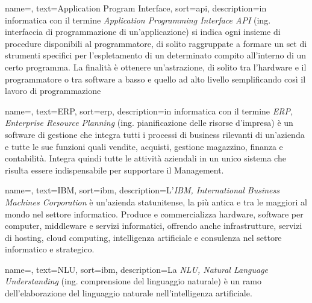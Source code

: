 
\renewcommand{\acronymname}{Acronimi e abbreviazioni}




\renewcommand{\glossaryname}{Glossario}

{
	name=,
	text=Application Program Interface,
	sort=api,
	description={in informatica con il termine \emph{Application Programming Interface API} (ing. interfaccia di programmazione di un'applicazione) si indica ogni insieme di procedure disponibili al programmatore, di solito raggruppate a formare un set di strumenti specifici per l'espletamento di un determinato compito all'interno di un certo programma. La finalità è ottenere un'astrazione, di solito tra l'hardware e il programmatore o tra software a basso e quello ad alto livello semplificando così il lavoro di programmazione}
}


{
    name=,
    text=ERP,
    sort=erp,
    description={in informatica con il termine \emph{ERP, Enterprise Resource Planning} (ing. pianificazione delle risorse d'impresa) è un software di gestione che integra tutti i processi di business rilevanti di un'azienda e tutte le sue funzioni quali vendite, acquisti, gestione magazzino, finanza e contabilità. Integra quindi tutte le attività aziendali in un unico sistema che risulta essere indispensabile per supportare il Management.}
}

{
	name=,
	text=IBM,
	sort=ibm,
	description={L'\emph{IBM, International Business Machines Corporation} è un'azienda statunitense, la più antica e tra le maggiori al mondo nel settore informatico. Produce e commercializza hardware, software per computer, middleware e servizi informatici, offrendo anche infrastrutture, servizi di hosting, cloud computing, intelligenza artificiale e consulenza nel settore informatico e strategico.}
}

{
	name=,
	text=NLU,
	sort=ibm,
	description={La \emph{NLU, Natural Language Understanding} (ing. comprensione del linguaggio naturale) è un ramo dell'elaborazione del linguaggio naturale nell'intelligenza artificiale.}
}

